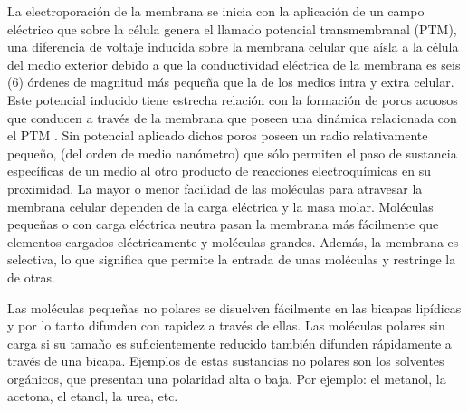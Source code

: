 La electroporación de la membrana se inicia con la aplicación de un campo eléctrico que sobre la célula genera el llamado potencial transmembranal (PTM), una diferencia de voltaje inducida sobre la membrana celular que aísla a la célula del medio exterior \cite{c5-puchiar} debido a que la conductividad eléctrica de la membrana es seis (6) órdenes de magnitud más pequeña que la de los medios intra y extra celular. Este potencial inducido tiene estrecha relación con la formación de poros acuosos que conducen a través de la membrana que poseen una dinámica relacionada con el PTM \cite{c8}. Sin potencial aplicado dichos poros poseen un radio relativamente pequeño, (del orden de medio nanómetro) que sólo permiten el paso de sustancia específicas de un medio al otro producto de reacciones electroquímicas en su proximidad. La mayor o menor facilidad de las moléculas para atravesar la membrana celular dependen de la carga eléctrica y la masa molar. Moléculas pequeñas o con carga eléctrica neutra pasan la membrana más fácilmente que elementos cargados eléctricamente y moléculas grandes. Además, la membrana es selectiva, lo que significa que permite la entrada de unas moléculas y restringe la de otras.

Las moléculas pequeñas no polares se disuelven fácilmente en las bicapas lipídicas y por lo tanto difunden con rapidez a través de ellas. Las moléculas polares sin carga si su tamaño es suficientemente reducido también difunden rápidamente a través de una bicapa. Ejemplos de estas sustancias no polares son los solventes orgánicos, que presentan una polaridad alta o baja. Por ejemplo: el metanol, la acetona, el etanol, la urea, etc.

